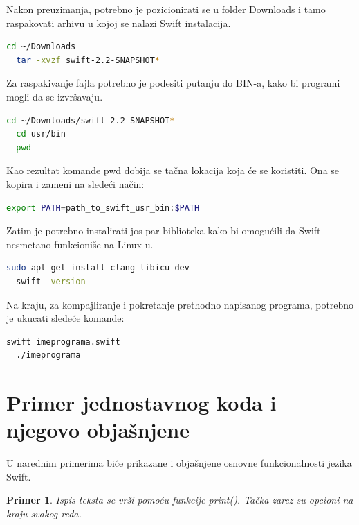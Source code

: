 \documentclass[a4paper]{article}
\newtheorem{primer}{Primer}[section]
\begin{document}
Nakon preuzimanja, potrebno je pozicionirati se u folder Downloads i tamo raspakovati arhivu u kojoj se nalazi Swift instalacija.

\begin{lstlisting}[language=bash, caption={Raspakovanje Swift instalacije}]
  cd ~/Downloads
  tar -xvzf swift-2.2-SNAPSHOT*
\end{lstlisting}

Za raspakivanje fajla potrebno je podesiti putanju do BIN-a, kako bi programi mogli da se izvršavaju.

\begin{lstlisting}[language=bash, caption={Podešavanje putanje do BIN-a}]
  cd ~/Downloads/swift-2.2-SNAPSHOT*
  cd usr/bin
  pwd
\end{lstlisting}

Kao rezultat komande pwd dobija se tačna lokacija koja će se koristiti. Ona se kopira i zameni na sledeći način:
\begin{lstlisting}[language=bash, caption={Kopiranje putanje}]
  export PATH=path_to_swift_usr_bin:$PATH
\end{lstlisting}

Zatim je potrebno instalirati jos par biblioteka kako bi omogućili da Swift nesmetano funkcioniše na Linux-u.

\begin{lstlisting}[language=bash, caption={Instalacija biblioteka}]
  sudo apt-get install clang libicu-dev
  swift -version
\end{lstlisting}

Na kraju, za kompajliranje i pokretanje prethodno napisanog programa, potrebno je ukucati sledeće komande:

\begin{lstlisting}[language=bash, caption={Komanda za kompajliranje}]
  swift imeprograma.swift
  ./imeprograma
\end{lstlisting}

\section{Primer jednostavnog koda i njegovo objašnjene}	
\label{sec:sedmiDeo}
U narednim primerima biće prikazane i objašnjene osnovne funkcionalnosti jezika Swift.

\begin{primer}
Ispis teksta se vrši pomoću funkcije print(). Tačka-zarez su opcioni na kraju svakog reda.
\end{primer}
\end{document}
